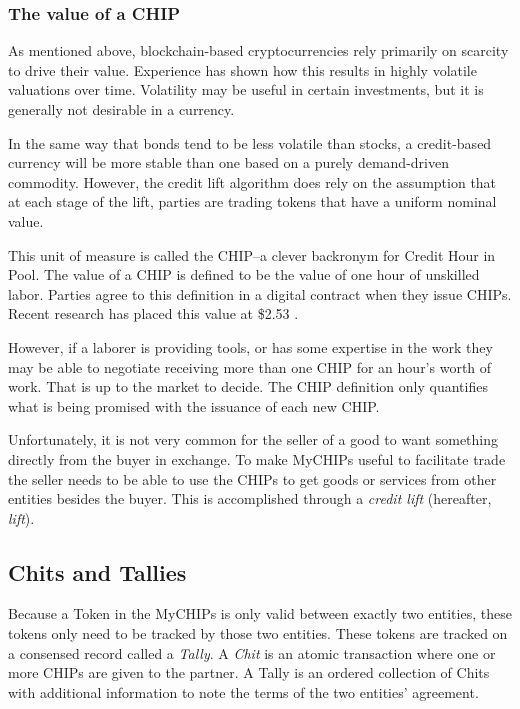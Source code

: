 \documentclass[runningheads]{llncs}
\begin{document}
\subsubsection{The value of a CHIP}
As mentioned above, blockchain-based cryptocurrencies rely primarily on scarcity to drive their value.
Experience has shown how this results in highly volatile valuations over time.
Volatility may be useful in certain investments, but it is generally not desirable in a currency.

In the same way that bonds tend to be less volatile than stocks, a credit-based currency will be more stable than one based on a purely demand-driven commodity.
However, the credit lift algorithm does rely on the assumption that at each stage of the lift, parties are trading tokens that have a uniform nominal value.

This unit of measure is called the CHIP--a clever backronym for Credit Hour in Pool.
The value of a CHIP is defined to be the value of one hour of unskilled labor. Parties agree to this definition in a digital contract when they issue CHIPs. Recent research has placed this value at \$2.53 \cite{bateman_chip_value}.

However, if a laborer is providing tools, or has some expertise in the work they may be able to negotiate receiving more than one CHIP for an hour's worth of work.
That is up to the market to decide.
The CHIP definition only quantifies what is being promised with the issuance of each new CHIP.

Unfortunately, it is not very common for the seller of a good to want something directly from the buyer in exchange. To make MyCHIPs useful to facilitate trade the seller needs to be able to use the CHIPs to get goods or services from other entities besides the buyer. This is accomplished through a \emph{credit lift} (hereafter, \emph{lift}).

\subsection{Chits and Tallies}
Because a Token in the MyCHIPs is only valid between exactly two entities, these tokens only need to be tracked by those two entities. These tokens are tracked on a consensed record called a \emph{Tally}. A \emph{Chit} is an atomic transaction where one or more CHIPs are given to the partner. A Tally is an ordered collection of Chits with additional information to note the terms of the two entities' agreement. 
\end{document}

